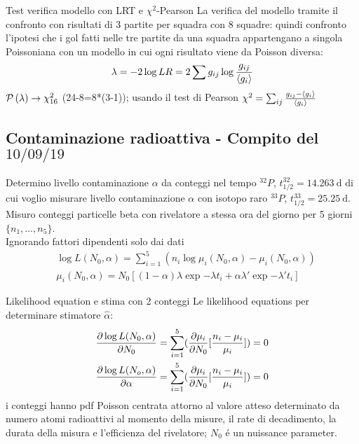 \begin{frame}{Test verifica modello con LRT e $\chi^2$-Pearson}
La verifica del modello tramite il confronto con risultati di 3 partite per squadra con 8 squadre: quindi confronto l'ipotesi che i gol fatti nelle tre partite da una squadra appartengano a singola Poissoniana con un modello in cui ogni risultato viene da Poisson diversa:
\[\lambda=-2\log{LR}=2\sum g_{ij}\log{\frac{g_{ij}}{\exv{g_i}}}\]
$\prob{(\lambda)}\to\chi^2_{16}$ (24-8=8*(3-1)); usando il test di Pearson $\chi^2=\sum_{ij}\frac{g_{ij}-\exv{g_i}}{\exv{g_i}}$
\end{frame}

\subsection{Contaminazione radioattiva - Compito del $10/09/19$}

\begin{frame}{Determino livello contaminazione $\alpha$ da conteggi nel tempo}
$^{32}P$, $t_{1/2}^{32}=\SI{14.263}{\day}$ di cui voglio misurare livello contaminazione $\alpha$ con isotopo raro $^{33}P$, $t_{1/2}^{33}=\SI{25.25}{\day}$. Misuro conteggi particelle beta con rivelatore a stessa ora del giorno per 5 giorni $\{n_1,\ldots,n_5\}$.\\
Ignorando fattori dipendenti solo dai dati
\begin{align*}
&\log{L(N_0,\alpha)}=\sum_{i=1}^5(n_i\log{\mu_i(N_0,\alpha)}-\mu_i(N_0,\alpha))\\
&\mu_i(N_0,\alpha)=N_0[(1-\alpha)\lambda\exp{-\lambda t_i}+\alpha\lambda'\exp{-\lambda't_i}]
\end{align*}
\end{frame}

\begin{frame}{Likelihood equation e stima con 2 conteggi}
Le likelihood equations per determinare stimatore $\hat{\alpha}$:
\begin{align*}
&\PDy{N_0}{\log{L(N_0,\alpha)}}=\sum_{i=1}^5(\PDy{N_0}{\mu_i}[\frac{n_i-\mu_i}{\mu_i}])=0\\
&\PDy{\alpha}{\log{L(N_o,\alpha)}}=\sum_{i=1}^5(\PDy{N_0}{\mu_i}[\frac{n_i-\mu_i}{\mu_i}])=0
\end{align*}
i conteggi hanno pdf Poisson centrata attorno al valore atteso determinato da numero atomi radioattivi al momento della misure, il rate di decadimento, la durata della misura e l'efficienza del rivelatore; $N_0$ \'e un nuissance parameter.
\end{frame}

